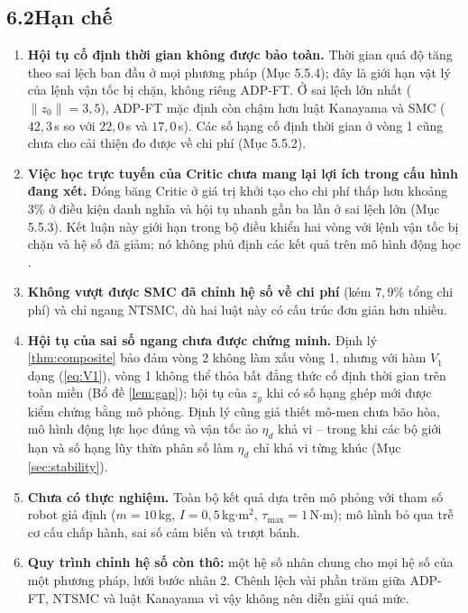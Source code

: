 \documentclass[12pt,a4paper]{article}
\begin{document}
\subsection*{6.2\quad Hạn chế}

\begin{enumerate}
    \item \textbf{Hội tụ cố định thời gian không được bảo toàn.} Thời gian quá độ tăng theo sai lệch ban đầu ở mọi phương pháp (Mục 5.5.4); đây là giới hạn vật lý của lệnh vận tốc bị chặn, không riêng ADP-FT. Ở sai lệch lớn nhất ($\|z_0\| = 3{,}5$), ADP-FT mặc định còn chậm hơn luật Kanayama và SMC ($42{,}3$\,s so với $22{,}0$\,s và $17{,}0$\,s). Các số hạng cố định thời gian ở vòng 1 cũng chưa cho cải thiện đo được về chi phí (Mục 5.5.2).

    \item \textbf{Việc học trực tuyến của Critic chưa mang lại lợi ích trong cấu hình đang xét.} Đóng băng Critic ở giá trị khởi tạo cho chi phí thấp hơn khoảng $3\%$ ở điều kiện danh nghĩa và hội tụ nhanh gần ba lần ở sai lệch lớn (Mục 5.5.3). Kết luận này giới hạn trong bộ điều khiển hai vòng với lệnh vận tốc bị chặn và hệ số đã giảm; nó không phủ định các kết quả trên mô hình động học \cite{Wang2025}.

    \item \textbf{Không vượt được SMC đã chỉnh hệ số về chi phí} (kém $7{,}9\%$ tổng chi phí) và chỉ ngang NTSMC, dù hai luật này có cấu trúc đơn giản hơn nhiều.

    \item \textbf{Hội tụ của sai số ngang chưa được chứng minh.} Định lý \ref{thm:composite} bảo đảm vòng 2 không làm xấu vòng 1, nhưng với hàm $V_1$ dạng (\ref{eq:V1}), vòng 1 không thể thỏa bất đẳng thức cố định thời gian trên toàn miền (Bổ đề \ref{lem:gap}); hội tụ của $z_y$ khi có số hạng ghép mới được kiểm chứng bằng mô phỏng. Định lý cũng giả thiết mô-men chưa bão hòa, mô hình động lực học đúng và vận tốc ảo $\eta_d$ khả vi -- trong khi các bộ giới hạn và số hạng lũy thừa phân số làm $\eta_d$ chỉ khả vi từng khúc (Mục \ref{sec:stability}).

    \item \textbf{Chưa có thực nghiệm.} Toàn bộ kết quả dựa trên mô phỏng với tham số robot giả định ($m = 10$\,kg, $I = 0{,}5$\,kg$\cdot$m$^2$, $\tau_\text{max} = 1$\,N$\cdot$m); mô hình bỏ qua trễ cơ cấu chấp hành, sai số cảm biến và trượt bánh.

    \item \textbf{Quy trình chỉnh hệ số còn thô:} một hệ số nhân chung cho mọi hệ số của một phương pháp, lưới bước nhân 2. Chênh lệch vài phần trăm giữa ADP-FT, NTSMC và luật Kanayama vì vậy không nên diễn giải quá mức.
\end{enumerate}
\end{document}
